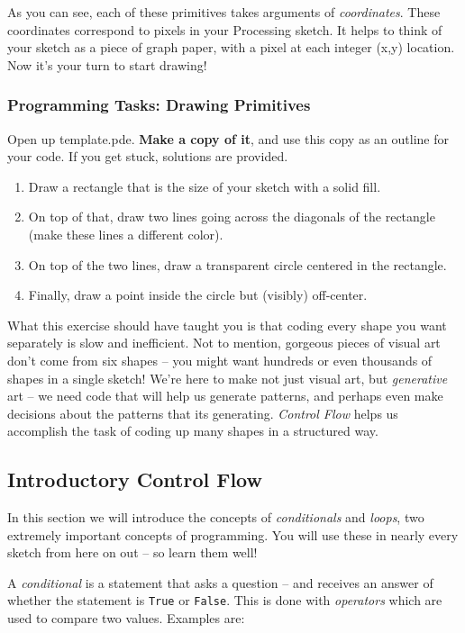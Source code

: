 As you can see, each of these primitives takes arguments of \emph{coordinates}.  These coordinates correspond to pixels in your Processing sketch.  It helps to think of your sketch as a piece of graph paper, with a pixel at each integer (x,y) location.  Now it's your turn to start drawing!

\subsubsection{Programming Tasks: Drawing Primitives}
Open up template.pde.  \textbf{Make a copy of it}, and use this copy as an outline for your code.  If you get stuck, solutions are provided.

\begin{enumerate}
\item Draw a rectangle that is the size of your sketch with a solid fill.
\item On top of that, draw two lines going across the diagonals of the rectangle (make these lines a different color).
\item On top of the two lines, draw a transparent circle centered in the rectangle.
\item Finally, draw a point inside the circle but (visibly) off-center.
\end{enumerate}

What this exercise should have taught you is that coding every shape you want separately is slow and inefficient.  Not to mention, gorgeous pieces of visual art don't come from six shapes -- you might want hundreds or even thousands of shapes in a single sketch!  We're here to make not just visual art, but \emph{generative} art -- we need code that will help us generate patterns, and perhaps even make decisions about the patterns that its generating.  \emph{Control Flow} helps us accomplish the task of coding up many shapes in a structured way.

\subsection{Introductory Control Flow}
In this section we will introduce the concepts of \emph{conditionals} and \emph{loops}, two extremely important concepts of programming.  You will use these in nearly every sketch from here on out -- so learn them well!

A \emph{conditional} is a statement that asks a question -- and receives an answer of whether the statement is \texttt{True} or \texttt{False}.  This is done with \emph{operators} which are used to compare two values.  Examples are:

